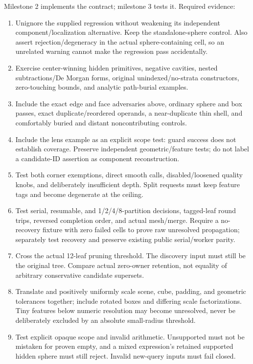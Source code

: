 \documentclass[11pt]{article}
\begin{document}
Milestone 2 implements the contract; milestone 3 tests it. Required evidence:
\begin{enumerate}
\item Unignore the supplied regression without weakening its independent
component/localization alternative. Keep the standalone-sphere control. Also
assert rejection/degeneracy in the actual sphere-containing cell, so an
unrelated warning cannot make the regression pass accidentally.
\item Exercise center-winning hidden primitives, negative cavities, nested
subtractions/De Morgan forms, original unindexed/no-strata constructors,
zero-touching bounds, and analytic path-burial examples.
\item Include the exact edge and face adversaries above, ordinary sphere and
box passes, exact duplicate/reordered operands, a near-duplicate thin shell,
and comfortably buried and distant noncontributing controls.
\item Include the lens example as an explicit scope test: guard success does
not establish coverage. Preserve independent geometric/feature tests; do not
label a candidate-ID assertion as component reconstruction.
\item Test both corner exemptions, direct smooth calls, disabled/loosened
quality knobs, and deliberately insufficient depth. Split requests must keep
feature tags and become degenerate at the ceiling.
\item Test serial, resumable, and 1/2/4/8-partition decisions, tagged-leaf
round trips, reversed completion order, and actual mesh/merge. Require a
no-recovery fixture with zero failed cells to prove raw unresolved propagation;
separately test recovery and preserve existing public serial/worker parity.
\item Cross the actual 12-leaf pruning threshold. The discovery input must
still be the original tree. Compare actual zero-owner retention, not equality
of arbitrary conservative candidate supersets.
\item Translate and positively uniformly scale scene, cube, padding, and
geometric tolerances together; include rotated boxes and differing scale
factorizations. Tiny features below numeric resolution may become unresolved,
never be deliberately excluded by an absolute small-radius threshold.
\item Test explicit opaque scope and invalid arithmetic. Unsupported must not
be mistaken for proven empty, and a mixed expression's retained supported
hidden sphere must still reject. Invalid new-query inputs must fail closed.
\end{enumerate}
\end{document}

